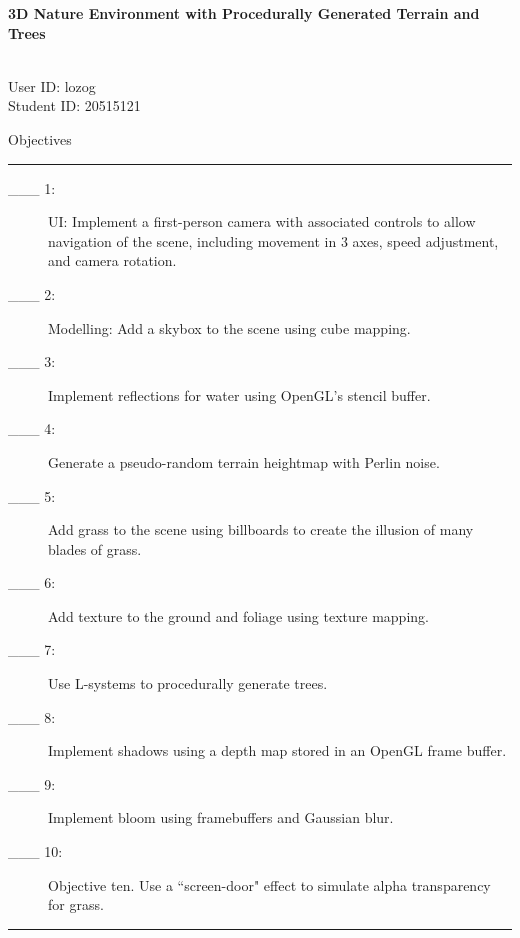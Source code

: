 \documentclass{article}
\newcommand\projecttitle{3D Nature Environment with Procedurally Generated Terrain and Trees}
\newcommand\myname{Liam Ozog}
\newcommand\myuserid{lozog}
\newcommand\mystudentid{20515121}
\begin{document}
{\noindent \huge \bf 
	\projecttitle 
}

\medskip
\noindent{Name: \myname} \\ 
User ID: \myuserid \\ 
Student ID: \mystudentid 

\bigskip
{\Large Objectives}

\hrule
\begin{description}
        \item[\_\_\_ 1:]
          UI: Implement a first-person camera with associated controls to allow navigation of the scene, including movement in 3 axes, speed adjustment, and camera rotation.

        \item[\_\_\_ 2:]
		  Modelling: Add a skybox to the scene using cube mapping.

        \item[\_\_\_ 3:]
		  Implement reflections for water using OpenGL's stencil buffer.
			
        \item[\_\_\_ 4:]
		  Generate a pseudo-random terrain heightmap with Perlin noise.

        \item[\_\_\_ 5:]
		  Add grass to the scene using billboards to create the illusion of many blades of grass.

        \item[\_\_\_ 6:]
	      Add texture to the ground and foliage using texture mapping.

        \item[\_\_\_ 7:]
		  Use L-systems to procedurally generate trees.

        \item[\_\_\_ 8:]
		  Implement shadows using a depth map stored in an OpenGL frame buffer.

        \item[\_\_\_ 9:]
		  Implement bloom using framebuffers and Gaussian blur.

        \item[\_\_\_ 10:]
		  Objective ten. Use a ``screen-door" effect to simulate alpha transparency for grass.

\end{description}

\hrule
\end{document}
